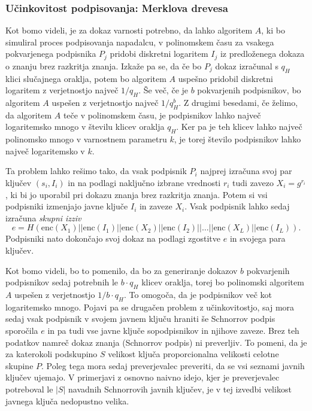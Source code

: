 \subsubsection{Učinkovitost podpisovanja: Merklova drevesa}
Kot bomo videli, je za dokaz varnosti potrebno, da lahko algoritem $A$, ki bo simuliral
proces podpisovanja napadalcu, v polinomskem času za vsakega pokvarjenega podpisnika $P_j$ pridobi
diskretni logaritem $I_j$ iz predloženega dokaza o znanju brez razkritja znanja. Izkaže pa se, da če
bo $P_j$ dokaz izračunal s $q_H$ klici slučajnega oraklja, potem bo algoritem $A$ uspešno
pridobil diskretni logaritem z verjetnostjo največ $1/q_H$. Še več, če je $b$ pokvarjenih podpisnikov,
bo algoritem $A$ uspešen z verjetnostjo največ $1/q_H^b$. Z drugimi besedami, če želimo,
da algoritem $A$ teče v polinomskem času, je podpisnikov lahko največ logaritemsko mnogo v
številu klicev oraklja $q_H$. Ker pa je teh klicev lahko največ polinomsko mnogo v varnostnem parametru
$k$, je torej število podpisnikov lahko največ logaritemsko v $k$.

Ta problem lahko rešimo tako, da vsak podpisnik $P_i$ najprej izračuna svoj par ključev $(s_i, I_i)$
in na podlagi naključno izbrane vrednosti $r_i$ tudi zavezo $X_i = g^{r_i}$, ki bi jo uporabil pri
dokazu znanja brez razkritja znanja. Potem si vsi podpisniki izmenjajo javne ključe $I_i$ in zaveze
$X_i$. Vsak podpisnik lahko sedaj izračuna \textit{skupni izziv}
$$
e = H(\text{enc}(X_1) || \text{enc}(I_1) || \text{enc}(X_2) || \text{enc}(I_2) || \dots || \text{enc}(X_L) || \text{enc}(I_L)).
$$
Podpisniki nato dokončajo svoj dokaz na podlagi zgostitve $e$ in svojega para ključev.

Kot bomo videli, bo to pomenilo, da bo za generiranje dokazov $b$ pokvarjenih podpisnikov sedaj potrebnih
le $b \cdot q_H$ klicev oraklja, torej bo polinomski algoritem $A$ uspešen z verjetnostjo $1/b \cdot q_H$.
To omogoča, da je podpisnikov več kot logaritemsko mnogo. Pojavi pa se drugačen problem z učinkovitostjo,
saj mora sedaj vsak podpisnik v svojem javnem ključu hraniti še Schnorrov podpis sporočila $e$ in pa
tudi vse javne ključe sopodpisnikov in njihove zaveze. Brez teh podatkov namreč dokaz znanja (Schnorrov
podpis) ni preverljiv. To pomeni, da je za katerokoli podskupino $S$ velikost ključa proporcionalna
velikosti celotne skupine $P$. Poleg tega mora sedaj preverjevalec preveriti, da se vsi seznami javnih
ključev ujemajo. V primerjavi z osnovno naivno idejo, kjer je preverjevalec potreboval le $|S|$ navadnih
Schnorrovih javnih ključev, je v tej izvedbi velikost javnega ključa nedopustno velika.

